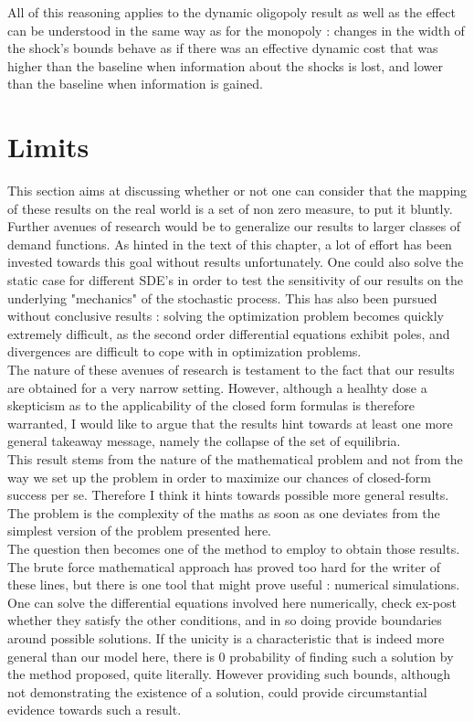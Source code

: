 All of this reasoning applies to the dynamic oligopoly result as well as the effect can be understood in the same way as for the monopoly : changes in the width of the shock's bounds behave as if there was an effective dynamic cost that was higher than the baseline when information about the shocks is lost, and lower than the baseline when information is gained.

\section{Limits}\label{limits}

This section aims at discussing whether or not one can consider that the mapping of these results on the real world is a set of non zero measure, to put it bluntly.\\

Further avenues of research would be to generalize our results to larger classes of demand functions. As hinted in the text of this chapter, a lot of effort has been invested towards this goal without results unfortunately. One could also solve the static case for different SDE's in order to test the sensitivity of our results on the underlying "mechanics" of the stochastic process. This has also been pursued without conclusive results : solving the optimization problem becomes quickly extremely difficult, as the second order differential equations exhibit poles, and divergences are difficult to cope with in optimization problems. \\

The nature of these avenues of research is testament to the fact that our results are obtained for a very narrow setting. However, although a healhty dose a skepticism as to the applicability of the closed form formulas is therefore warranted, I would like to argue that the results hint towards at least one more general takeaway message, namely the collapse of the set of equilibria.\\

This result stems from the nature of the mathematical problem and not from the way we set up the problem in order to maximize our chances of closed-form success per se. Therefore I think it hints towards possible more general results. The problem is the complexity of the maths as soon as one deviates from the simplest version of the problem presented here. \\

The question then becomes one of the method to employ to obtain those results. The brute force mathematical approach has proved too hard for the writer of these lines, but there is one tool that might prove useful : numerical simulations. One can solve the differential equations involved here numerically, check ex-post whether they satisfy the other conditions, and in so doing provide boundaries around possible solutions. If the unicity is a characteristic that is indeed more general than our model here, there is 0 probability of finding such a solution by the method proposed, quite literally. However providing such bounds, although not demonstrating the existence of a solution, could provide circumstantial evidence towards such a result.\\


